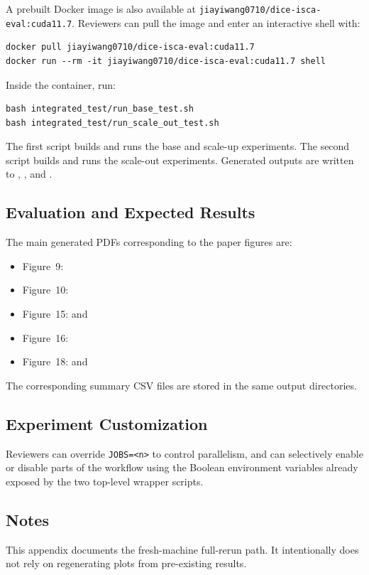 A prebuilt Docker image is also available at \texttt{jiayiwang0710/dice-isca-eval:cuda11.7}. Reviewers can pull the image and enter an interactive shell with:

\begin{verbatim}
docker pull jiayiwang0710/dice-isca-eval:cuda11.7
docker run --rm -it jiayiwang0710/dice-isca-eval:cuda11.7 shell
\end{verbatim}

Inside the container, run:

\begin{verbatim}
bash integrated_test/run_base_test.sh
bash integrated_test/run_scale_out_test.sh
\end{verbatim}

The first script builds and runs the base and scale-up experiments. The second script builds and runs the scale-out experiments. Generated outputs are written to , , and .

\subsection{Evaluation and Expected Results}
The main generated PDFs corresponding to the paper figures are:

\begin{itemize}
  \item Figure~9: 
  \item Figure~10: 
  \item Figure~15:  and 
  \item Figure~16: 
  \item Figure~18:  and 
\end{itemize}

The corresponding summary CSV files are stored in the same output directories.

\subsection{Experiment Customization}
Reviewers can override \texttt{JOBS=<n>} to control parallelism, and can selectively enable or disable parts of the workflow using the Boolean environment variables already exposed by the two top-level wrapper scripts.

\subsection{Notes}
This appendix documents the fresh-machine full-rerun path. It intentionally does not rely on regenerating plots from pre-existing results.
